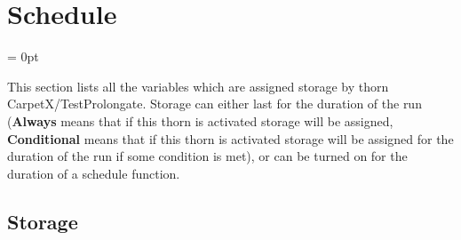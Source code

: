 
\section{Schedule} 


\parskip = 0pt


\noindent This section lists all the variables which are assigned storage by thorn CarpetX/TestProlongate.  Storage can either last for the duration of the run ({\bf Always} means that if this thorn is activated storage will be assigned, {\bf Conditional} means that if this thorn is activated storage will be assigned for the duration of the run if some condition is met), or can be turned on for the duration of a schedule function.


\subsection*{Storage}

\hspace{5mm}

